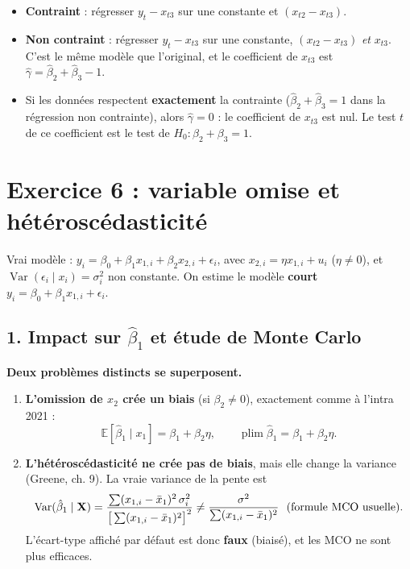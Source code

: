 \documentclass[11pt,a4paper]{article}
\newcommand{\E}{\mathbb{E}}\newcommand{\Var}{\operatorname{Var}}\newcommand{\Cov}{\operatorname{Cov}}
\newcommand{\plim}{\operatorname{plim}}
\begin{document}
\begin{reponse}
\begin{itemize}[nosep]
\item \textbf{Contraint} : régresser $y_t-x_{t3}$ sur une constante et $(x_{t2}-x_{t3})$.
\item \textbf{Non contraint} : régresser $y_t-x_{t3}$ sur une constante, $(x_{t2}-x_{t3})$ \emph{et} $x_{t3}$. C'est le même modèle que l'original, et le coefficient de $x_{t3}$ est $\hat\gamma=\hat\beta_2+\hat\beta_3-1$.
\item Si les données respectent \textbf{exactement} la contrainte ($\hat\beta_2+\hat\beta_3=1$ dans la régression non contrainte), alors $\hat\gamma=0$ : le coefficient de $x_{t3}$ est nul. Le test $t$ de ce coefficient est le test de $H_0:\beta_2+\beta_3=1$.
\end{itemize}
\end{reponse}

\section{Exercice 6 : variable omise et hétéroscédasticité}

Vrai modèle : $y_i=\beta_0+\beta_1x_{1,i}+\beta_2x_{2,i}+\epsilon_i$, avec $x_{2,i}=\eta x_{1,i}+u_i$ ($\eta\neq0$), et $\Var(\epsilon_i\mid x_i)=\sigma_i^2$ non constante. On estime le modèle \textbf{court} $y_i=\beta_0+\beta_1x_{1,i}+\epsilon_i$.

\subsection*{1. Impact sur $\hat\beta_1$ et étude de Monte Carlo}

\textbf{Deux problèmes distincts se superposent.}
\begin{enumerate}
\item \textbf{L'omission de $x_2$ crée un biais} (si $\beta_2\neq0$), exactement comme à l'intra 2021 :
\[
\E[\hat\beta_1\mid x_1]=\beta_1+\beta_2\eta,\qquad \plim\hat\beta_1=\beta_1+\beta_2\eta .
\]
\item \textbf{L'hétéroscédasticité ne crée pas de biais}, mais elle change la variance (Greene, ch. 9). La vraie variance de la pente est
\[
\Var(\hat\beta_1\mid\vX)=\frac{\sum(x_{1,i}-\bar x_1)^2\,\sigma_i^2}{\big[\sum(x_{1,i}-\bar x_1)^2\big]^2}\neq\frac{\sigma^2}{\sum(x_{1,i}-\bar x_1)^2}\ \ \text{(formule MCO usuelle)}.
\]
L'écart-type affiché par défaut est donc \textbf{faux} (biaisé), et les MCO ne sont plus efficaces.
\end{enumerate}
\end{document}
